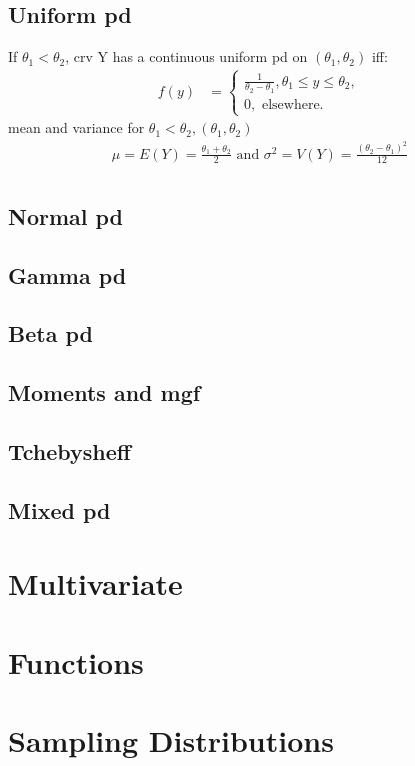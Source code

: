 \documentclass[12pt]{article}
\begin{document}
	\subsection{Uniform pd}
	If $ \theta_1 < \theta_2 $, crv Y has a continuous uniform pd on 
	$ (\theta_1, \theta_2) $ iff:
	\begin{align*}
		f(y) &= 
		\begin{cases}
			\frac{1}{\theta_2 - \theta_1}, \theta_1 \le y \le \theta_2, \\
			0, \text{ elsewhere. } 
		\end{cases}
	\end{align*}
	mean and variance for $ \theta_1 < \theta_2, (\theta_1, \theta_2) $
	\begin{align*}
		\mu = E(Y) = \frac{\theta_1 + \theta_2}{2} \text{ and } 
		\sigma^2 = V(Y) = \frac{(\theta_2 - \theta_1)^2}{12} \\ 
	\end{align*}
	\subsection{Normal pd}
	\subsection{Gamma pd}
	\subsection{Beta pd}
	\subsection{Moments and mgf}
	\subsection{Tchebysheff}
	\subsection{Mixed pd}
	

\section{Multivariate}
\section{Functions}
\section{Sampling Distributions}
\end{document}
